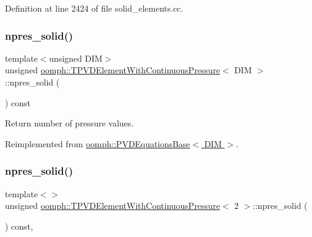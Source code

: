 Definition at line 2424 of file solid\+\_\+elements.\+cc.

\mbox{\label{classoomph_1_1TPVDElementWithContinuousPressure_a3d468e3b84be5dee1ff2d556b82e9554}} 
\subsubsection{\texorpdfstring{npres\+\_\+solid()}{npres\_solid()}\hspace{0.1cm}{\footnotesize\ttfamily [1/3]}}
{\footnotesize\ttfamily template$<$unsigned D\+IM$>$ \\
unsigned \hyperlink{classoomph_1_1TPVDElementWithContinuousPressure}{oomph\+::\+T\+P\+V\+D\+Element\+With\+Continuous\+Pressure}$<$ D\+IM $>$\+::npres\+\_\+solid (\begin{DoxyParamCaption}{ }\end{DoxyParamCaption}) const\hspace{0.3cm}{\ttfamily [virtual]}}



Return number of pressure values. 



Reimplemented from \hyperlink{classoomph_1_1PVDEquationsBase_a6e8457327151e87d2fa5694148afc7cc}{oomph\+::\+P\+V\+D\+Equations\+Base$<$ D\+I\+M $>$}.

\mbox{\label{classoomph_1_1TPVDElementWithContinuousPressure_a8c72c90b0a9fbf199683bf46cdc7116f}} 
\subsubsection{\texorpdfstring{npres\+\_\+solid()}{npres\_solid()}\hspace{0.1cm}{\footnotesize\ttfamily [2/3]}}
{\footnotesize\ttfamily template$<$$>$ \\
unsigned \hyperlink{classoomph_1_1TPVDElementWithContinuousPressure}{oomph\+::\+T\+P\+V\+D\+Element\+With\+Continuous\+Pressure}$<$ 2 $>$\+::npres\+\_\+solid (\begin{DoxyParamCaption}{ }\end{DoxyParamCaption}) const\hspace{0.3cm}{\ttfamily [inline]}, {\ttfamily [virtual]}}

